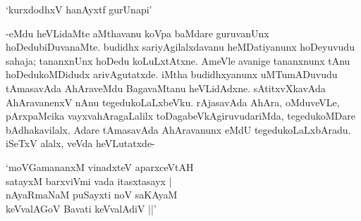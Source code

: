 \begin{shloka}
`kurxdodhxV hanAyxtf gurUnapi'
\end{shloka}

-eMdu heVLidaMte aMthavanu koVpa baMdare guruvanUnx hoDedubiDuvanaMte. budidhx sariyAgilalxdavanu heMDatiyanunx hoDeyuvudu sahaja; tananxnUnx hoDedu koLuLxtAtxne. AmeVle avanige tananxnunx tAnu hoDedukoMDidudx arivAgutatxde. iMtha budidhxyanunx uMTumADuvudu tAmasavAda AhAraveMdu BagavaMtanu heVLidAdxne. sAtitxvXkavAda AhAravanenxV nAnu tegedukoLaLxbeVku. rAjasavAda AhAra, oMduveVLe, pArxpaMcika vayxvahAragaLalilx toDagabeVkAgiruvudariMda, tegedukoMDare bAdhakavilalx. Adare tAmasavAda AhAravanunx eMdU tegedukoLaLxbAradu. iSeTxV alalx, veVda heVLutatxde-

\begin{shloka}
`moVGamananxM vinadxteV aparxceVtAH\\
satayxM barxviVmi vada itasxtasayx |\\
nAyaRmaNaM puSayxti noV saKAyaM\\
keVvalAGoV Bavati keVvalAdiV ||'
\end{shloka}

